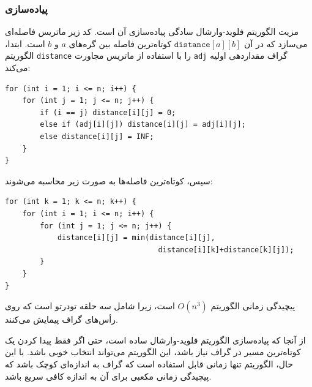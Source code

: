 \subsubsection{پیاده‌سازی}

مزیت الگوریتم فلوید-وارشال
سادگی پیاده‌سازی آن است.
کد زیر ماتریس فاصله‌ای می‌سازد که در آن $\texttt{distance}[a][b]$
کوتاه‌ترین فاصله بین گره‌های $a$ و $b$ است.
ابتدا، الگوریتم \texttt{distance} را
با استفاده از ماتریس مجاورت \texttt{adj} گراف مقداردهی اولیه می‌کند:

\begin{lstlisting}
for (int i = 1; i <= n; i++) {
    for (int j = 1; j <= n; j++) {
        if (i == j) distance[i][j] = 0;
        else if (adj[i][j]) distance[i][j] = adj[i][j];
        else distance[i][j] = INF;
    }
}
\end{lstlisting}
سپس، کوتاه‌ترین فاصله‌ها به صورت زیر محاسبه می‌شوند:
\begin{lstlisting}
for (int k = 1; k <= n; k++) {
    for (int i = 1; i <= n; i++) {
        for (int j = 1; j <= n; j++) {
            distance[i][j] = min(distance[i][j],
                                   distance[i][k]+distance[k][j]);
        }
    }
}
\end{lstlisting}

پیچیدگی زمانی الگوریتم $O(n^3)$ است، زیرا شامل سه حلقه تو‌در‌تو است که روی رأس‌های گراف پیمایش می‌کنند.

از آنجا که پیاده‌سازی الگوریتم فلوید-وارشال ساده است، حتی اگر فقط پیدا کردن یک کوتاه‌ترین مسیر در گراف نیاز باشد، این الگوریتم می‌تواند انتخاب خوبی باشد. با این حال، الگوریتم تنها زمانی قابل استفاده است که گراف به اندازه‌ای کوچک باشد که پیچیدگی زمانی مکعبی برای آن به اندازه کافی سریع باشد.